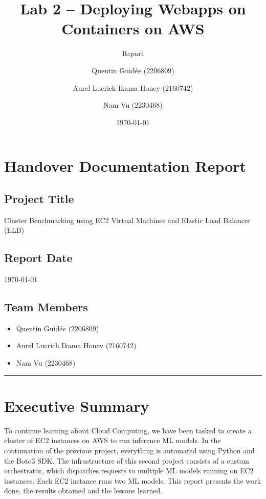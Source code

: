 \documentclass[letterpaper,headings=standardclasses,parskip=half]{scrartcl}
\title{Lab 2 – Deploying Webapps on Containers on AWS}
\subtitle{Report}
\author{
    Quentin Guidée (2206809) 
    \and
    Aurel Lucrich Ikama Honey (2160742)
    \and
    Nam Vu (2230468)
}
\date{\today}
\begin{document}
\maketitle
\thispagestyle{empty}

\clearpage
{}
\tableofcontents

\clearpage
\section*{Handover Documentation Report}

\subsection*{Project Title}

Cluster Benchmarking using EC2 Virtual Machines and Elastic Load Balancer (ELB)

\subsection*{Report Date}

\today

\subsection*{Team Members}

\begin{itemize}
    \item Quentin Guidée (2206809)
    \item Aurel Lucrich Ikama Honey (2160742)
    \item Nam Vu (2230468)
\end{itemize}

\noindent\rule{\textwidth}{0.3pt}

\section*{Executive Summary}

To continue learning about Cloud Computing, we have been tasked to create a cluster of EC2 instances on AWS to run inference ML models.
In the continuation of the previous project, everything is automated using Python and the Boto3 SDK.
The infrastructure of this second project consists of a custom orchestrator, which dispatches requests to multiple ML models running on EC2 instances. Each EC2 instance runs two ML models.
This report presents the work done, the results obtained and the lessons learned.
\end{document}
